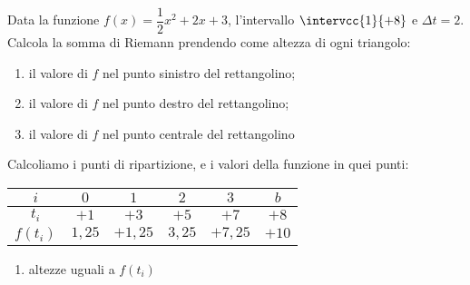 \begin{esempio}
Data la funzione \(f(x) = \dfrac{1}{2}x^2 +2x +3\), 
l'intervallo \(\intervcc{1}{+8}\)
e \(\Delta t = 2\).
Calcola la somma di Riemann prendendo come altezza di ogni triangolo: 

\begin{enumerate} [nosep]
\item il valore di \(f\) nel punto sinistro del rettangolino;
\item il valore di \(f\) nel punto destro del rettangolino;
\item il valore di \(f\) nel punto centrale del rettangolino
\end{enumerate}

Calcoliamo i punti di ripartizione, e i valori della funzione in quei 
punti:

\begin{center}
\begin{tabular}{cccccc}
\(i\) & \(0\) & \(1\) & \(2\) & \(3\) & \(b\) \\
\midrule
\(t_i\) & \(+1\) & \(+3\) & \(+5\) & \(+7\) & \(+8\) \\
\(f(t_i)\) & \(1,25\) & \(+1,25\) & \(3,25\) & \(+7,25\) & \(+10\) \\
\midrule
\end{tabular}
\end{center}

\begin{enumerate}
\item altezze  uguali a \(f(t_i)\)



\end{enumerate}
\end{esempio}
